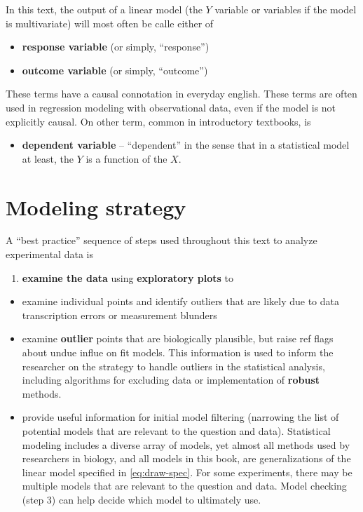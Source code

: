 \documentclass[]{book}
\providecommand{\tightlist}{%
  \setlength{\itemsep}{0pt}\setlength{\parskip}{0pt}}
\begin{document}
In this text, the output of a linear model (the \(Y\) variable or variables if the model is multivariate) will most often be calle either of

\begin{itemize}
\tightlist
\item
  \textbf{response variable} (or simply, ``response'')
\item
  \textbf{outcome variable} (or simply, ``outcome'')
\end{itemize}

These terms have a causal connotation in everyday english. These terms are often used in regression modeling with observational data, even if the model is not explicitly causal. On other term, common in introductory textbooks, is

\begin{itemize}
\tightlist
\item
  \textbf{dependent variable} -- ``dependent'' in the sense that in a statistical model at least, the \(Y\) is a function of the \(X\).
\end{itemize}

\hypertarget{modeling-strategy}{%
\section{Modeling strategy}\label{modeling-strategy}}

A ``best practice'' sequence of steps used throughout this text to analyze experimental data is

\begin{enumerate}
\def\labelenumi{\arabic{enumi}.}
\tightlist
\item
  \textbf{examine the data} using \textbf{exploratory plots} to
\end{enumerate}

\begin{itemize}
\tightlist
\item
  examine individual points and identify outliers that are likely due to data transcription errors or measurement blunders
\item
  examine \textbf{outlier} points that are biologically plausible, but raise ref flags about undue influe on fit models. This information is used to inform the researcher on the strategy to handle outliers in the statistical analysis, including algorithms for excluding data or implementation of \textbf{robust} methods.
\item
  provide useful information for initial model filtering (narrowing the list of potential models that are relevant to the question and data). Statistical modeling includes a diverse array of models, yet almost all methods used by researchers in biology, and all models in this book, are generalizations of the linear model specified in \eqref{eq:draw-spec}. For some experiments, there may be multiple models that are relevant to the question and data. Model checking (step 3) can help decide which model to ultimately use.
\end{itemize}
\end{document}
